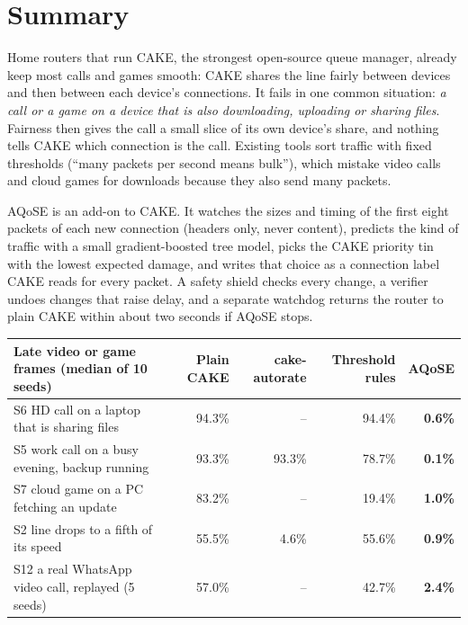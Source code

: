 \documentclass[11pt,a4paper]{article}
\newcommand{\ours}[1]{\textbf{\color{aq}#1}}
\begin{document}
\section*{Summary}

Home routers that run CAKE, the strongest open-source queue manager, already keep most calls and games smooth: CAKE shares the line fairly between devices and then between each device's connections. It fails in one common situation: \emph{a call or a game on a device that is also downloading, uploading or sharing files}. Fairness then gives the call a small slice of its own device's share, and nothing tells CAKE which connection is the call. Existing tools sort traffic with fixed thresholds (``many packets per second means bulk''), which mistake video calls and cloud games for downloads because they also send many packets.

AQoSE is an add-on to CAKE. It watches the sizes and timing of the first eight packets of each new connection (headers only, never content), predicts the kind of traffic with a small gradient-boosted tree model, picks the CAKE priority tin with the lowest expected damage, and writes that choice as a connection label CAKE reads for every packet. A safety shield checks every change, a verifier undoes changes that raise delay, and a separate watchdog returns the router to plain CAKE within about two seconds if AQoSE stops.

\begin{table}[H]\centering\small
\begin{tabular}{@{}lrrrr@{}}
\toprule
Late video or game frames (median of 10 seeds) & Plain CAKE & cake-autorate & Threshold rules & \textbf{AQoSE} \\
\midrule
S6 HD call on a laptop that is sharing files & 94.3\% & -- & 94.4\% & \ours{0.6\%} \\
S5 work call on a busy evening, backup running & 93.3\% & 93.3\% & 78.7\% & \ours{0.1\%} \\
S7 cloud game on a PC fetching an update & 83.2\% & -- & 19.4\% & \ours{1.0\%} \\
S2 line drops to a fifth of its speed & 55.5\% & 4.6\% & 55.6\% & \ours{0.9\%} \\
S12 a real WhatsApp video call, replayed (5 seeds) & 57.0\% & -- & 42.7\% & \ours{2.4\%} \\
\bottomrule
\end{tabular}
\end{table}
\end{document}
